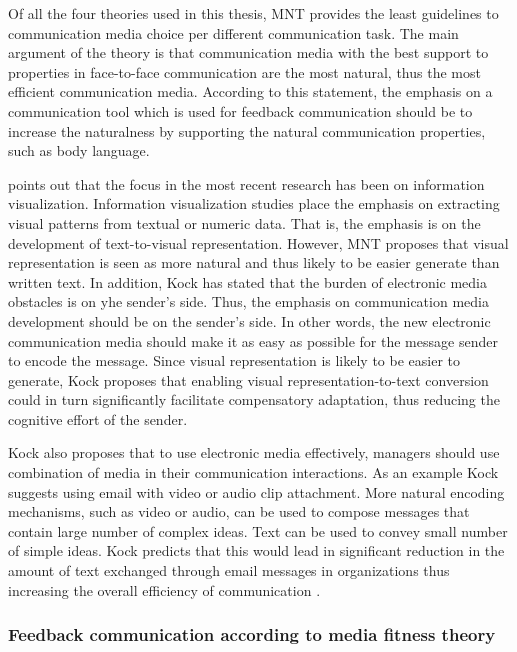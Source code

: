 \documentclass[english,12pt,a4paper,pdftex]{article}
\begin{document}
Of all the four theories used in this thesis, \ac{MNT} provides the least guidelines to communication media choice per different communication task. The main argument of the theory is that communication media with the best support to properties in face-to-face communication are the most natural, thus the most efficient communication media. According to this statement, the emphasis on a communication tool which is used for feedback communication should be to increase the naturalness by supporting the natural communication properties, such as body language. \citep{kock2005} \citep{kock2004}

\citet{kock2007} points out that the focus in the most recent research has been on information visualization. Information visualization studies place the emphasis on extracting visual patterns from textual or numeric data. That is, the emphasis is on the development of text-to-visual representation. However, \ac{MNT} proposes that visual representation is seen as more natural and thus likely to be easier generate than written text. In addition, Kock has stated that the burden of electronic media obstacles is on yhe sender's side. Thus, the emphasis on communication media development should be on the sender's side. In other words, the new electronic communication media should make it as easy as possible for the message sender to encode the message. Since visual representation is likely to be easier to generate, Kock proposes that enabling visual representation-to-text conversion could in turn significantly facilitate compensatory adaptation, thus reducing the cognitive effort of the sender.

Kock also proposes that to use electronic media effectively, managers should use combination of media in their communication interactions. As an example Kock suggests using email with video or audio clip attachment. More natural encoding mechanisms, such as video or audio, can be used to compose messages that contain large number of complex ideas. Text can be used to convey small number of simple ideas. Kock predicts that this would lead in significant reduction in the amount of text exchanged through email messages in organizations thus increasing the overall efficiency of communication \citet{kock2007}.

\subsubsection{Feedback communication according to media fitness theory}
\label{sec:feedback_mft}
\end{document}
